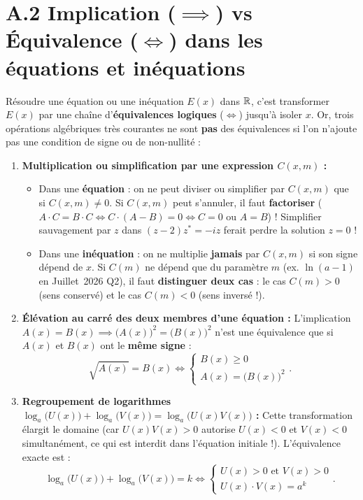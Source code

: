 \section*{A.2 Implication ($\implies$) vs Équivalence ($\iff$) dans les équations et inéquations}

Résoudre une équation ou une inéquation $E(x)$ dans $\mathbb{R}$, c'est transformer $E(x)$ par une chaîne d'\textbf{équivalences logiques} ($\iff$) jusqu'à isoler $x$. Or, trois opérations algébriques très courantes ne sont \textbf{pas} des équivalences si l'on n'ajoute pas une condition de signe ou de non-nullité :

\begin{theoreme}
\begin{enumerate}
    \item \textbf{Multiplication ou simplification par une expression $C(x, m)$ :}
    \begin{itemize}
        \item Dans une \textbf{équation} : on ne peut diviser ou simplifier par $C(x,m)$ que si $\boxed{C(x,m) \neq 0}$. Si $C(x,m)$ peut s'annuler, il faut \textbf{factoriser} ($A\cdot C = B\cdot C \iff C\cdot(A - B) = 0 \iff C = 0 \text{ ou } A = B$) ! Simplifier sauvagement par $z$ dans $(z-2)z^* = -iz$ ferait perdre la solution $z = 0$ !
        \item Dans une \textbf{inéquation} : on ne multiplie \textbf{jamais} par $C(x,m)$ si son signe dépend de $x$. Si $C(m)$ ne dépend que du paramètre $m$ (ex. $\ln(a - 1)$ en Juillet~2026 Q2), il faut \textbf{distinguer deux cas} : le cas $C(m) > 0$ (sens conservé) et le cas $C(m) < 0$ (sens inversé !).
    \end{itemize}
    \item \textbf{Élévation au carré des deux membres d'une équation :}
    L'implication $A(x) = B(x) \implies \bigl(A(x)\bigr)^2 = \bigl(B(x)\bigr)^2$ n'est une équivalence que si $A(x)$ et $B(x)$ ont le \textbf{même signe} :
    \[
        \boxed{\sqrt{A(x)} = B(x) \iff \begin{cases} B(x) \ge 0 \\ A(x) = \bigl(B(x)\bigr)^2 \end{cases}}.
    \]
    \item \textbf{Regroupement de logarithmes $\log_a\bigl(U(x)\bigr) + \log_a\bigl(V(x)\bigr) = \log_a\bigl(U(x)V(x)\bigr)$ :}
    Cette transformation élargit le domaine (car $U(x)V(x) > 0$ autorise $U(x) < 0$ et $V(x) < 0$ simultanément, ce qui est interdit dans l'équation initiale !). L'équivalence exacte est :
    \[
        \boxed{\log_a\bigl(U(x)\bigr) + \log_a\bigl(V(x)\bigr) = k \iff \begin{cases} U(x) > 0 \text{ et } V(x) > 0 \\ U(x)\cdot V(x) = a^k \end{cases}}.
    \]
\end{enumerate}
\end{theoreme}
